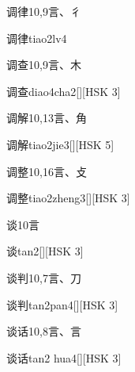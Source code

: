 \begin{entry}{调律}{10,9}{⾔、⼻}
  \begin{phonetics}{调律}{tiao2lv4}
  \end{phonetics}
\end{entry}

\begin{entry}{调查}{10,9}{⾔、⽊}
  \begin{phonetics}{调查}{diao4cha2}[][HSK 3]
  \end{phonetics}
\end{entry}

\begin{entry}{调解}{10,13}{⾔、⾓}
  \begin{phonetics}{调解}{tiao2jie3}[][HSK 5]
  \end{phonetics}
\end{entry}

\begin{entry}{调整}{10,16}{⾔、⽁}
  \begin{phonetics}{调整}{tiao2zheng3}[][HSK 3]
  \end{phonetics}
\end{entry}

\begin{entry}{谈}{10}{⾔}
  \begin{phonetics}{谈}{tan2}[][HSK 3]
  \end{phonetics}
\end{entry}

\begin{entry}{谈判}{10,7}{⾔、⼑}
  \begin{phonetics}{谈判}{tan2pan4}[][HSK 3]
  \end{phonetics}
\end{entry}

\begin{entry}{谈话}{10,8}{⾔、⾔}
  \begin{phonetics}{谈话}{tan2 hua4}[][HSK 3]
  \end{phonetics}
\end{entry}

